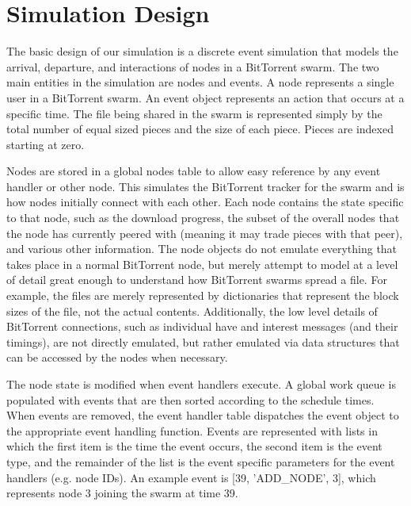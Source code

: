 \section{Simulation Design}

The basic design of our simulation is a discrete event simulation
that models the arrival, departure, and interactions of nodes in a
BitTorrent swarm. The two main entities in the simulation are nodes
and events. A node represents a single user in a BitTorrent swarm.
An event object represents an action that occurs at a specific time.
The file being shared in the swarm is represented simply by the total
number of equal sized pieces and the size of each piece. Pieces are
indexed starting at zero.

Nodes are stored in a global nodes table to allow easy reference by
any event handler or other node. This simulates the BitTorrent tracker
for the swarm and is how nodes initially connect with each other. Each
node contains the state specific to that node, such as the download
progress, the subset of the overall nodes that the node has currently
peered with (meaning it may trade pieces with that peer), and various
other information. The node objects do not emulate everything that takes
place in a normal BitTorrent node, but merely attempt to model at a
level of detail great enough to understand how BitTorrent swarms spread
a file. For example, the files are merely represented by dictionaries
that represent the block sizes of the file, not the actual contents.
Additionally, the low level details of BitTorrent connections, such
as individual have and interest messages (and their timings), are not
directly emulated, but rather emulated via data structures that can be
accessed by the nodes when necessary.

The node state is modified when event handlers execute.
A global work queue is populated with events that are
then sorted according to the schedule times. When events are removed,
the event handler table dispatches the event object to the appropriate
event handling function. Events are represented with lists in which the first
item is the time the event occurs, the second item is the event type, and the remainder
of the list is the event specific parameters for the event handlers (e.g. node IDs).
An example event is [39, 'ADD\_NODE', 3], which represents node 3 joining the swarm at
time 39.

